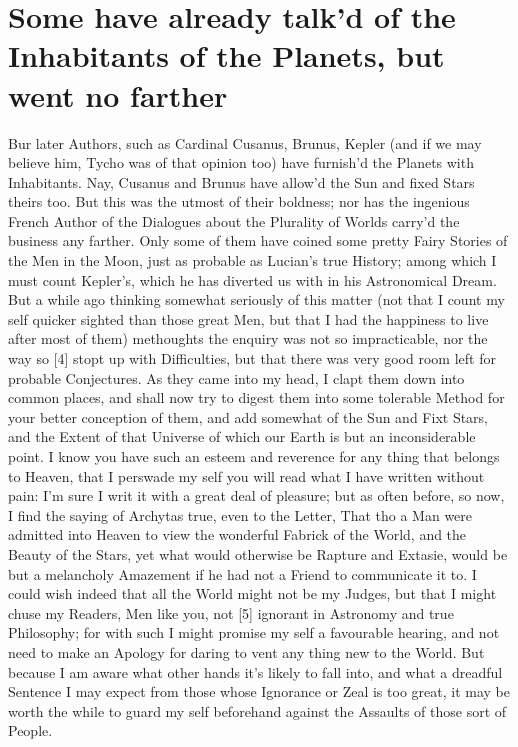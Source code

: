 \documentclass[letterpaper]{book}
\begin{document}
\section{Some have already talk'd of the Inhabitants of the
Planets, but went no farther}

Bur later Authors, such as Cardinal Cusanus, Brunus, Kepler (and if we may
believe him, Tycho was of that opinion too) have furnish'd the Planets with
Inhabitants. Nay, Cusanus and Brunus have allow'd the Sun and fixed Stars
theirs too. But this was the utmost of their boldness; nor has the ingenious
French Author of the Dialogues about the Plurality of Worlds carry'd the
business any farther. Only some of them have coined some pretty Fairy
Stories of the Men in the Moon, just as probable as Lucian's true History;
among which I must count Kepler's, which he has diverted us with in his
Astronomical Dream. But a while ago thinking somewhat seriously of this
matter (not that I count my self quicker sighted than those great Men, but
that I had the happiness to live after most of them) methoughts the enquiry
was not so impracticable, nor the way so [4] stopt up with Difficulties, but
that there was very good room left for probable Conjectures. As they came
into my head, I clapt them down into common places, and shall now try to
digest them into some tolerable Method for your better conception of them,
and add somewhat of the Sun and Fixt Stars, and the Extent of that Universe
of which our Earth is but an inconsiderable point. I know you have such an
esteem and reverence for any thing that belongs to Heaven, that I perswade
my self you will read what I have written without pain: I'm sure I writ it
with a great deal of pleasure; but as often before, so now, I find the
saying of Archytas true, even to the Letter, That tho a Man were admitted
into Heaven to view the wonderful Fabrick of the World, and the Beauty of
the Stars, yet what would otherwise be Rapture and Extasie, would be but a
melancholy Amazement if he had not a Friend to communicate it to. I could
wish indeed that all the World might not be my Judges, but that I might
chuse my Readers, Men like you, not [5] ignorant in Astronomy and true
Philosophy; for with such I might promise my self a favourable hearing, and
not need to make an Apology for daring to vent any thing new to the World.
But because I am aware what other hands it's likely to fall into, and what a
dreadful Sentence I may expect from those whose Ignorance or Zeal is too
great, it may be worth the while to guard my self beforehand against the
Assaults of those sort of People.
\end{document}
